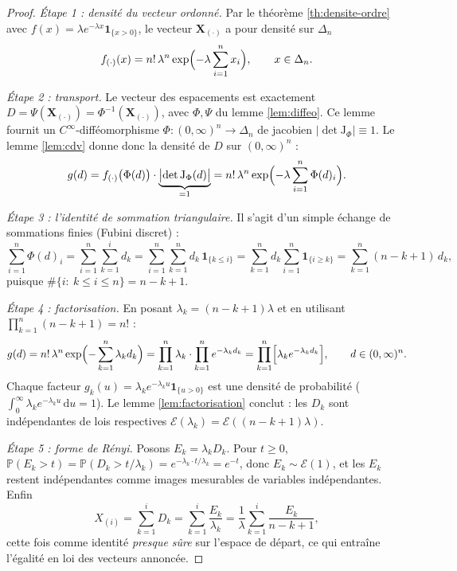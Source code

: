 \documentclass[11pt,a4paper]{article}
\theoremstyle{plain}
\theoremstyle{definition}
\theoremstyle{remark}
\newcommand{\Prob}{\mathbb{P}}
\newcommand{\Expo}{\mathcal{E}}
\newcommand{\Xord}[1]{X_{(#1)}}
\newcommand{\dd}{\,\mathrm{d}}
\newcommand{\Jac}{\mathrm{J}}
\begin{document}
\begin{proof}
\emph{Étape 1 : densité du vecteur ordonné.} Par le théorème
\ref{th:densite-ordre} avec $f(x)=\lambda e^{-\lambda x}\mathbf 1_{\{x>0\}}$, le
vecteur $\mathbf X_{(\cdot)}$ a pour densité sur $\Delta_n$
\[
f_{(\cdot)}(x)=n!\,\lambda^n\exp\Bigl(-\lambda\sum_{i=1}^n x_i\Bigr),\qquad x\in\Delta_n .
\]

\emph{Étape 2 : transport.} Le vecteur des espacements est exactement
$D=\Psi(\mathbf X_{(\cdot)})=\Phi^{-1}(\mathbf X_{(\cdot)})$, avec $\Phi,\Psi$ du
lemme \ref{lem:diffeo}. Ce lemme fournit un $C^\infty$-difféomorphisme
$\Phi:(0,\infty)^n\to\Delta_n$ de jacobien $|\det \Jac_\Phi|\equiv1$. Le lemme
\ref{lem:cdv} donne donc la densité de $D$ sur $(0,\infty)^n$ :
\[
g(d)=f_{(\cdot)}\bigl(\Phi(d)\bigr)\cdot\underbrace{\bigl|\det \Jac_\Phi(d)\bigr|}_{=1}
=n!\,\lambda^n\exp\Bigl(-\lambda\sum_{i=1}^n \Phi(d)_i\Bigr).
\]

\emph{Étape 3 : l'identité de sommation triangulaire.} Il s'agit d'un simple
échange de sommations finies (Fubini discret) :
\[
\sum_{i=1}^n\Phi(d)_i=\sum_{i=1}^n\sum_{k=1}^i d_k
=\sum_{i=1}^n\sum_{k=1}^n d_k\,\mathbf 1_{\{k\le i\}}
=\sum_{k=1}^n d_k\sum_{i=1}^n\mathbf 1_{\{i\ge k\}}
=\sum_{k=1}^n (n-k+1)\,d_k ,
\]
puisque $\#\{i:\ k\le i\le n\}=n-k+1$.

\emph{Étape 4 : factorisation.} En posant $\lambda_k=(n-k+1)\lambda$ et en
utilisant $\prod_{k=1}^n(n-k+1)=n!$ :
\[
g(d)=n!\,\lambda^n\exp\Bigl(-\sum_{k=1}^n\lambda_k d_k\Bigr)
=\prod_{k=1}^n\lambda_k\cdot\prod_{k=1}^n e^{-\lambda_k d_k}
=\prod_{k=1}^n\Bigl[\lambda_k e^{-\lambda_k d_k}\Bigr],\qquad d\in(0,\infty)^n .
\]
Chaque facteur $g_k(u)=\lambda_k e^{-\lambda_k u}\mathbf 1_{\{u>0\}}$ est une
densité de probabilité ($\int_0^\infty\lambda_k e^{-\lambda_k u}\dd u=1$). Le
lemme \ref{lem:factorisation} conclut : les $D_k$ sont indépendantes de lois
respectives $\Expo(\lambda_k)=\Expo((n-k+1)\lambda)$.

\emph{Étape 5 : forme de Rényi.} Posons $E_k=\lambda_k D_k$. Pour $t\ge0$,
$\Prob(E_k>t)=\Prob(D_k>t/\lambda_k)=e^{-\lambda_k\cdot t/\lambda_k}=e^{-t}$,
donc $E_k\sim\Expo(1)$, et les $E_k$ restent indépendantes comme images
mesurables de variables indépendantes. Enfin
\[
\Xord i=\sum_{k=1}^i D_k=\sum_{k=1}^i\frac{E_k}{\lambda_k}
=\frac1\lambda\sum_{k=1}^i\frac{E_k}{n-k+1},
\]
cette fois comme identité \emph{presque sûre} sur l'espace de départ, ce qui
entraîne l'égalité en loi des vecteurs annoncée. \qedhere
\end{proof}
\end{document}
